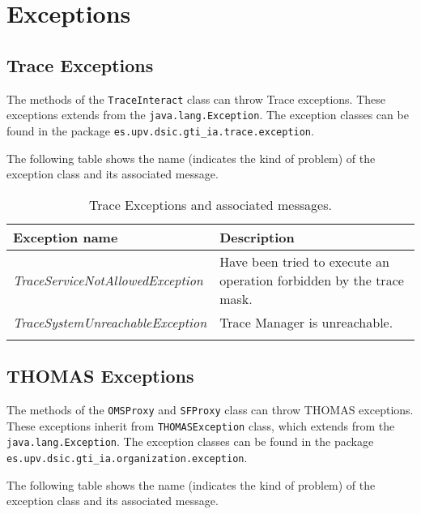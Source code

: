 \chapter{Exceptions}\label{app:Exceptions}

\section{Trace Exceptions}

The methods of the \lstinline|TraceInteract| class can throw Trace exceptions. These exceptions extends from the \lstinline|java.lang.Exception|. The exception classes can be found in the package \lstinline|es.upv.dsic.gti_ia.trace.exception|.


The following table shows the name (indicates the kind of problem) of the exception class and its associated message.

\begin{longtable}{|p{6.5cm}|p{7.2cm}|}
\hline
  \textbf{Exception name} & \textbf{Description} \\ \endhead \hline
  \emph{TraceServiceNotAllowedException} & Have been tried to execute an operation forbidden by the trace mask. \\ \hline
  \emph{TraceSystemUnreachableException} & Trace Manager is unreachable. \\ \hline

\caption{Trace Exceptions and associated messages.}
\end{longtable}

\section{THOMAS Exceptions}

The methods of the \lstinline|OMSProxy| and \lstinline|SFProxy| class can throw THOMAS exceptions. These exceptions inherit from \lstinline|THOMASException| class, which extends from the \lstinline|java.lang.Exception|. The exception classes can be found in the package \lstinline|es.upv.dsic.gti_ia.organization.exception|.


The following table shows the name (indicates the kind of problem) of the exception class and its associated message.


